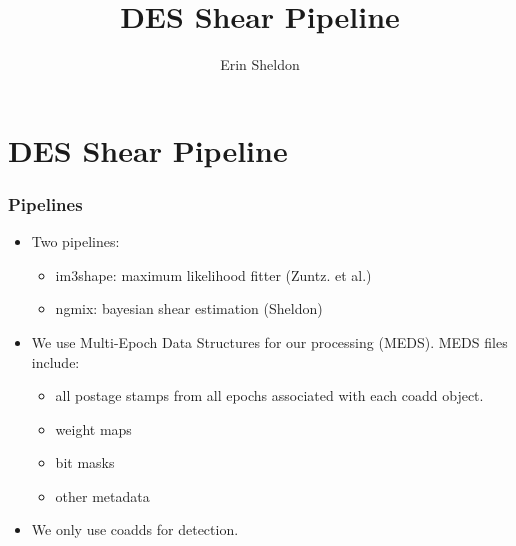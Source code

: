 \documentclass{beamer}
\title{DES Shear Pipeline}
\author{Erin Sheldon}
\institute{Brookhaven National Laboratory}
\begin{document}

\section{DES Shear Pipeline}

\frame
{
    \frametitle{Pipelines}

    \begin{itemize}
        \item Two pipelines:
            \begin{itemize}
                \item im3shape: maximum likelihood fitter (Zuntz. et al.)
                \item ngmix: bayesian shear estimation (Sheldon)
            \end{itemize}

        \item We use Multi-Epoch Data Structures for our processing (MEDS).
            MEDS files include:
            \begin{itemize}
                \item all postage stamps from all epochs associated with
                    each coadd object.
                \item weight maps
                \item bit masks
                \item other metadata
            \end{itemize}
        \item We only use coadds for detection.

    \end{itemize}
}
\end{document}
